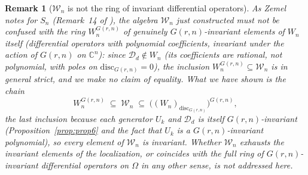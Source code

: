 \documentclass[10pt,a4paper]{amsart}
\newtheorem{remark}[theorem]{Remark}
\newcommand{\CC}{\mathbb{C}}
\begin{document}
\begin{remark}[$\mathcal W_n$ is not the ring of invariant differential operators]
As Zemel notes for $S_n$ (Remark~14 of \cite{Ze}), the algebra $\mathcal W_n$ just constructed must not be confused with the ring $W_n^{G(r,n)}$ of \emph{genuinely} $G(r,n)$-invariant elements of $W_n$ itself (differential operators with polynomial coefficients, invariant under the action of $G(r,n)$ on $\CC^n$): since $\mathcal D_d\notin W_n$ (its coefficients are rational, not polynomial, with poles on $\mathrm{disc}_{G(r,n)}=0$), the inclusion $W_n^{G(r,n)}\subseteq\mathcal W_n$ is in general strict, and we make no claim of equality. What we have shown is the chain
\[
W_n^{G(r,n)} \;\subseteq\; \mathcal W_n \;\subseteq\; \big((W_n)_{\mathrm{disc}_{G(r,n)}}\big)^{G(r,n)},
\]
the last inclusion because each generator $U_k$ and $\mathcal D_d$ is itself $G(r,n)$-invariant (Proposition~\ref{prop:prop6} and the fact that $U_k$ is a $G(r,n)$-invariant polynomial), so every element of $\mathcal W_n$ is invariant. Whether $\mathcal W_n$ exhausts the invariant elements of the localization, or coincides with the full ring of $G(r,n)$-invariant differential operators on $\Omega$ in any other sense, is not addressed here.
\end{remark}
\end{document}
